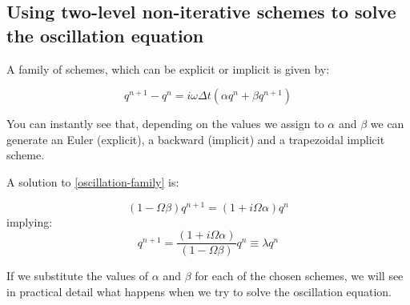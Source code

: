 \subsection{Using two-level non-iterative schemes to solve the oscillation equation}
A family of schemes, which can be explicit or implicit is given by:

\begin{equation}
	q^{n+1}-q^{n} = i \omega \Delta t (\alpha q^n + \beta q^{n+1})
	\label{oscillation-family}
\end{equation}

You can instantly see that, depending on the values we assign to $\alpha$ and $\beta$ we can generate an Euler (explicit), a backward (implicit) and a trapezoidal implicit scheme.

A solution to \ref{oscillation-family} is:

\begin{equation}
	(1-\Omega\beta)q^{n+1} = (1+i\Omega\alpha) q^n 
	\label{oscillation-family-solution}
\end{equation}
implying:
\begin{equation}
	q^{n+1} = \frac{(1+i\Omega\alpha)}{(1-\Omega\beta)} q^n \equiv \lambda q^n
	\label{oscillation-family-solution}
\end{equation}

If we substitute the values of $\alpha$ and $\beta$ for each of the chosen schemes, we will see in practical detail what happens when we try to solve the oscillation equation.\\


\medskip


\medskip


